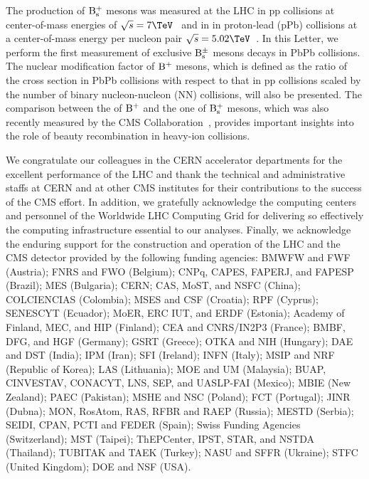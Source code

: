 The production of $\rm B_{\rm s }^{+}$ mesons was measured at the LHC in pp collisions at center-of-mass energies of $\sqrts=7\TeV$~\cite{Chatrchyan:2011vh}
and in in proton-lead (pPb) collisions at a center-of-mass energy per nucleon pair $\sqrts=5.02\TeV$~\cite{Khachatryan:2015uja}.
In this Letter, we perform the first measurement of exclusive $\rm B_{\rm s }^{\pm}$ mesons decays in PbPb collisions. The nuclear modification factor \RAA of $\rm B^{+}$ mesons, 
which is defined as the ratio of the cross section in PbPb collisions with respect to that in pp collisions scaled by the number of binary nucleon-nucleon (NN) collisions, 
will also be presented. The comparison between the \RAA of $\rm B^{+}$ and the one of $\rm B_{\rm s }^{+}$ mesons, which was also recently measured by the CMS Collaboration~\cite{PhysRevLett.119.152301}, provides
important insights into the role of beauty recombination in heavy-ion collisions. 
\begin{acknowledgments}
We congratulate our colleagues in the CERN accelerator departments for the excellent performance of the LHC and thank the technical and administrative staffs at CERN and at other CMS institutes for their contributions to the success of the CMS effort. In addition, we gratefully acknowledge the computing centers and personnel of the Worldwide LHC Computing Grid for delivering so effectively the computing infrastructure essential to our analyses. Finally, we acknowledge the enduring support for the construction and operation of the LHC and the CMS detector provided by the following funding agencies: BMWFW and FWF (Austria); FNRS and FWO (Belgium); CNPq, CAPES, FAPERJ, and FAPESP (Brazil); MES (Bulgaria); CERN; CAS, MoST, and NSFC (China); COLCIENCIAS (Colombia); MSES and CSF (Croatia); RPF (Cyprus); SENESCYT (Ecuador); MoER, ERC IUT, and ERDF (Estonia); Academy of Finland, MEC, and HIP (Finland); CEA and CNRS/IN2P3 (France); BMBF, DFG, and HGF (Germany); GSRT (Greece); OTKA and NIH (Hungary); DAE and DST (India); IPM (Iran); SFI (Ireland); INFN (Italy); MSIP and NRF (Republic of Korea); LAS (Lithuania); MOE and UM (Malaysia); BUAP, CINVESTAV, CONACYT, LNS, SEP, and UASLP-FAI (Mexico); MBIE (New Zealand); PAEC (Pakistan); MSHE and NSC (Poland); FCT (Portugal); JINR (Dubna); MON, RosAtom, RAS, RFBR and RAEP (Russia); MESTD (Serbia); SEIDI, CPAN, PCTI and FEDER (Spain); Swiss Funding Agencies (Switzerland); MST (Taipei); ThEPCenter, IPST, STAR, and NSTDA (Thailand); TUBITAK and TAEK (Turkey); NASU and SFFR (Ukraine); STFC (United Kingdom); DOE and NSF (USA).
\end{acknowledgments}





